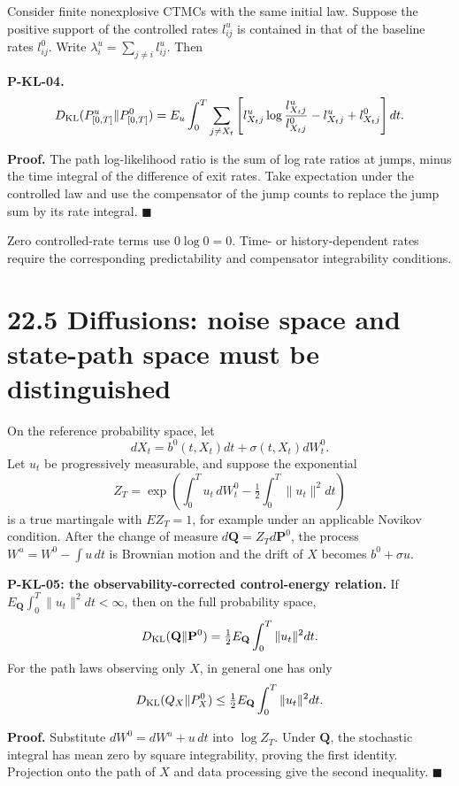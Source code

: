 \documentclass[
  english,
  11pt,
  oneside]{book}
\newcounter{none} %
\begin{document}
Consider finite nonexplosive CTMCs with the same initial law. Suppose the positive support of the controlled rates \(l^u_{ij}\) is contained in that of the baseline rates \(l^0_{ij}\). Write \(\lambda_i^u=\sum_{j\ne i}l^u_{ij}\). Then

\hypertarget{p-kl-04}{}\label{p-kl-04}

\textbf{P-KL-04.} \[D_{\rm KL}(P^u_{[0,T]}\|P^0_{[0,T]})
=
E_u\int_0^T
\sum_{j\ne X_t}
\left[
l^u_{X_tj}\log\frac{l^u_{X_tj}}{l^0_{X_tj}}
-l^u_{X_tj}+l^0_{X_tj}
\right]dt.\]

\textbf{Proof.} The path log-likelihood ratio is the sum of log rate ratios at jumps, minus the time integral of the difference of exit rates. Take expectation under the controlled law and use the compensator of the jump counts to replace the jump sum by its rate integral. \(\blacksquare\)

Zero controlled-rate terms use \(0\log0=0\). Time- or history-dependent rates require the corresponding predictability and compensator integrability conditions.

\section{22.5 Diffusions: noise space and state-path space must be distinguished}\label{diffusions-noise-space-and-state-path-space-must-be-distinguished}

On the reference probability space, let \[dX_t=b^0(t,X_t)dt+\sigma(t,X_t)dW_t^0.\] Let \(u_t\) be progressively measurable, and suppose the exponential \[Z_T=\exp\left(\int_0^T u_t\,dW_t^0-
\tfrac12\int_0^T\|u_t\|^2dt\right)\] is a true martingale with \(EZ_T=1\), for example under an applicable Novikov condition. After the change of measure \(d\mathbf Q=Z_Td\mathbf P^0\), the process \(W^u=W^0-\int u\,dt\) is Brownian motion and the drift of \(X\) becomes \(b^0+\sigma u\).

\hypertarget{p-kl-05}{}\label{p-kl-05}

\textbf{P-KL-05: the observability-corrected control-energy relation.} If \(E_{\mathbf Q}\int_0^T\|u_t\|^2dt<\infty\), then on the full probability space, \[D_{\rm KL}(\mathbf Q\|\mathbf P^0)
=\tfrac12E_{\mathbf Q}\int_0^T\|u_t\|^2dt.\] For the path laws observing only \(X\), in general one has only \[D_{\rm KL}(Q_X\|P_X^0)
\le\tfrac12E_{\mathbf Q}\int_0^T\|u_t\|^2dt.\]

\textbf{Proof.} Substitute \(dW^0=dW^u+u\,dt\) into \(\log Z_T\). Under \(\mathbf Q\), the stochastic integral has mean zero by square integrability, proving the first identity. Projection onto the path of \(X\) and data processing give the second inequality. \(\blacksquare\)
\end{document}
